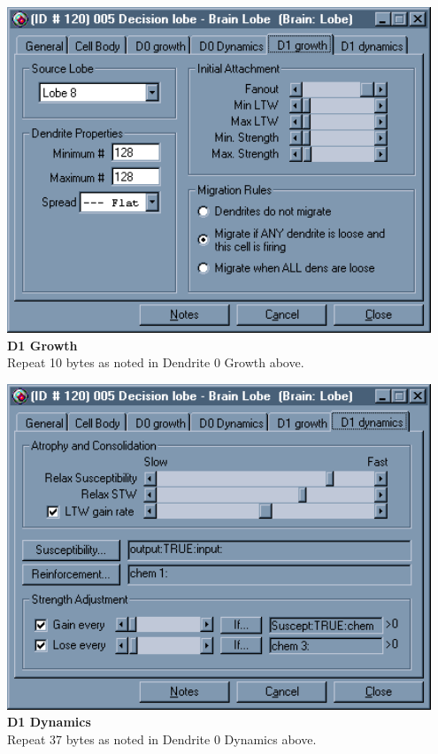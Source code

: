 \documentclass[11pt,twoside,a4paper]{article}
\begin{document}
\begin{minipage}[ht]{0.45\textwidth}
	\includegraphics[width=0.95\textwidth]{img/gen00k5.png}~\\
	\textbf{\large D1 Growth} ~\\
	Repeat 10 bytes as noted in Dendrite 0 Growth above.
\end{minipage} \hfill \begin{minipage}[ht]{0.45\textwidth}
	\includegraphics[width=0.95\textwidth]{img/gen00k6.png} ~\\
	\textbf{\large D1 Dynamics} ~\\
	Repeat 37 bytes as noted in Dendrite 0 Dynamics above.
\end{minipage} ~\\
\end{document}
